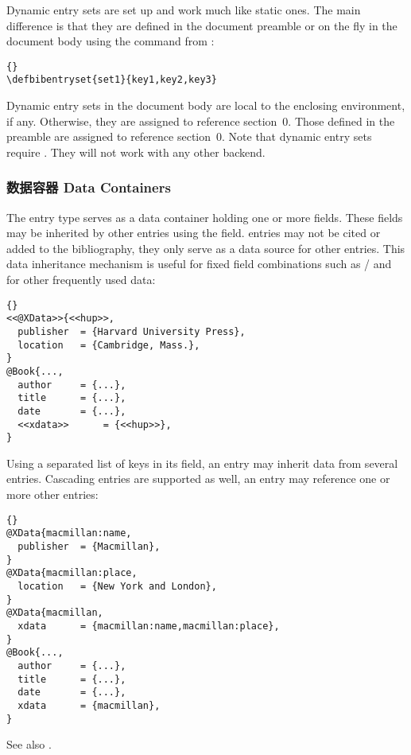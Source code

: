 Dynamic entry sets are set up and work much like static ones. The main difference is that they are defined in the document preamble or on the fly in the document body using the  command from :

\begin{lstlisting}[style=bibtex]{}
\defbibentryset{set1}{key1,key2,key3}
\end{lstlisting}
%
Dynamic entry sets in the document body are local to the enclosing  environment, if any. Otherwise, they are assigned to reference section~0. Those defined in the preamble are assigned to reference section~0. Note that dynamic entry sets require \biber. They will not work with any other backend.

\subsubsection[数据容器 Data Containers]{数据容器 Data Containers\BiberOnlyMark}
\label{use:use:xdat}

The  entry type serves as a data container holding one or more fields. These fields may be inherited by other entries using the  field.  entries may not be cited or added to the bibliography, they only serve as a data source for other entries. This data inheritance mechanism is useful for fixed field combinations such as \slash {} and for other frequently used data:

\begin{lstlisting}[style=bibtex]{}
<<@XData>>{<<hup>>,
  publisher  = {Harvard University Press},
  location   = {Cambridge, Mass.},
}
@Book{...,
  author     = {...},
  title	     = {...},
  date	     = {...},
  <<xdata>>      = {<<hup>>},
}
\end{lstlisting}
%
Using a separated list of keys in its  field, an entry may inherit data from several  entries. Cascading  entries are supported as well, \ie an  entry may reference one or more other  entries:

\begin{lstlisting}[style=bibtex]{}
@XData{macmillan:name,
  publisher  = {Macmillan},
}
@XData{macmillan:place,
  location   = {New York and London},
}
@XData{macmillan,
  xdata      = {macmillan:name,macmillan:place},
}
@Book{...,
  author     = {...},
  title	     = {...},
  date	     = {...},
  xdata	     = {macmillan},
}
\end{lstlisting}
%
See also .

